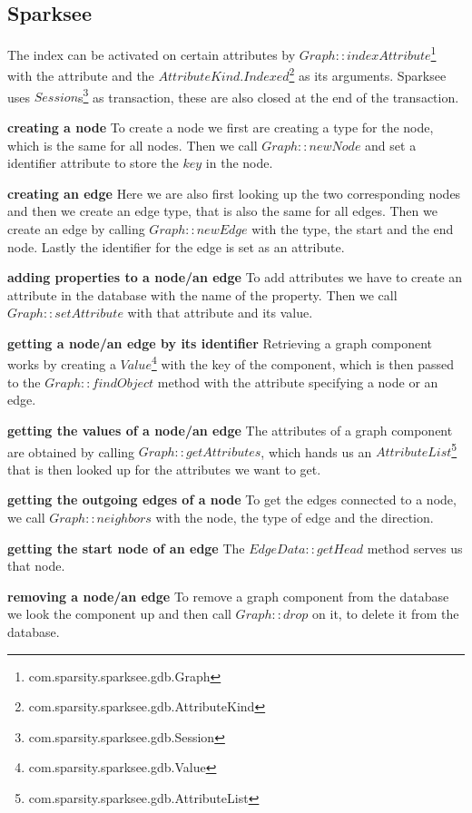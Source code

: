 \subsection{Sparksee}
The index can be activated on certain attributes by $ Graph::indexAttribute $\footnote{com.sparsity.sparksee.gdb.Graph} with the attribute and the $ AttributeKind.Indexed $\footnote{com.sparsity.sparksee.gdb.AttributeKind} as its arguments.
Sparksee uses $ Session $s\footnote{com.sparsity.sparksee.gdb.Session} as transaction,
these are also closed at the end of the transaction.

\textbf{creating a node} \newline
To create a node we first are creating a type for the node,
which is the same for all nodes.
Then we call $ Graph::newNode $ and set a identifier attribute to store the $ key $ in the node.

\textbf{creating an edge} \newline
Here we are also first looking up the two corresponding nodes and then we create an edge type,
that is also the same for all edges.
Then we create an edge by calling $ Graph::newEdge $ with the type,
the start and the end node.
Lastly the identifier for the edge is set as an attribute.

\textbf{adding properties to a node/an edge} \newline
To add attributes we have to create an attribute in the database with the name of the property.
Then we call $ Graph::setAttribute $ with that attribute and its value.

\textbf{getting a node/an edge by its identifier} \newline
Retrieving a graph component works by creating a $ Value $\footnote{com.sparsity.sparksee.gdb.Value} with the key of the component,
which is then passed to the $ Graph::findObject $ method with the attribute specifying a node or an edge.

\textbf{getting the values of a node/an edge} \newline
The attributes of a graph component are obtained by calling $ Graph::getAttributes $,
which hands us an $ AttributeList $\footnote{com.sparsity.sparksee.gdb.AttributeList} that is then looked up for the attributes we want to get.

\textbf{getting the outgoing edges of a node} \newline
To get the edges connected to a node,
we call $ Graph::neighbors $ with the node, the type of edge and the direction.

\textbf{getting the start node of an edge} \newline
The $ EdgeData::getHead $ method serves us that node.

\textbf{removing a node/an edge} \newline
To remove a graph component from the database we look the component up and then call $ Graph::drop $ on it,
to delete it from the database.
